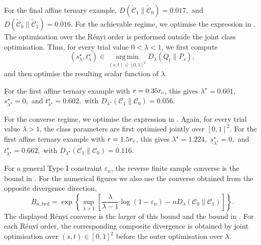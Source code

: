 \documentclass[journal,10pt,draftclsnofoot,onecolumn]{IEEEtran}
\begin{document}
For the final affine ternary example,
$D(\widetilde{\mathcal C}_1\| \widetilde{\mathcal C}_0) = 0.017,$ and $D(\widetilde{\mathcal C}_0\| \widetilde{\mathcal C}_1) = 0.016.$ 
For the achievable regime, we optimise the expression in . The optimisation over the R\'enyi order is performed outside the joint class optimisation. Thus, for every trial value $0<\lambda<1$, we first compute
\begin{equation*} 
(s_\lambda^\star,t_\lambda^\star) \in \operatorname*{arg\,min}_{(s,t)\in[0,1]^2} D_\lambda(Q_t\|P_s),
\end{equation*}
and then optimise the resulting scalar function of $\lambda$.

For the first affine ternary example with $r=0.35r_{\rm c}$, this gives $\lambda^\star=0.601,$ $s_{\lambda^\star}^\star=0,$ and $t_{\lambda^\star}^\star=0.602,$
with $D_{\lambda^\star}(\mathcal C_1\|\mathcal C_0)=0.056.$
 
For the converse regime, we optimise the expression in . Again, for every trial value $\lambda>1$, the class parameters are first optimised jointly over $[0,1]^2$. For the first affine ternary example with $r=1.5r_{\rm c}$, this gives
$\lambda^\star=1.224,$ $s_{\lambda^\star}^\star=0,$ and $t_{\lambda^\star}^\star=0.662,$
with $D_{\lambda^\star}(\mathcal C_1\|\mathcal C_0) = 0.116.$
 
For a general Type I constraint $\varepsilon_n$, the reverse finite sample converse is the bound in . For the numerical figures we also use the converse obtained from the opposite divergence direction,
\begin{equation} 
B_{n,\mathrm{fwd}} = \exp\left\{ \sup_{\lambda>1} \left[ \frac{\lambda}{\lambda-1}\log(1-\varepsilon_n) - nD_\lambda(\mathcal C_0\|\mathcal C_1) \right] \right\}.
\label{eq:appendix-forward-bound}
\end{equation} 
The displayed R\'enyi converse is the larger of this bound and the bound in . For each R\'enyi order, the corresponding composite divergence is obtained by joint optimisation over $(s,t)\in[0,1]^2$ before the outer optimisation over $\lambda$.
\end{document}
